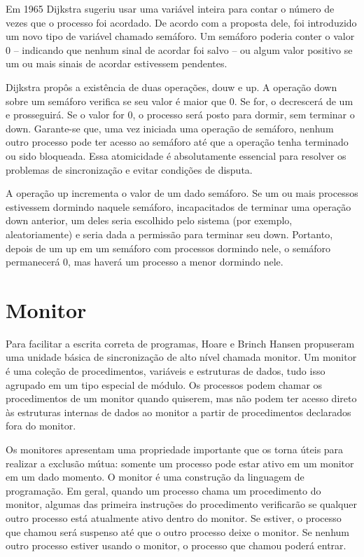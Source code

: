 Em 1965 Dijkstra sugeriu usar uma variável inteira para contar o número de vezes que o 
processo foi acordado. De acordo com a proposta dele, foi introduzido um novo tipo de 
variável chamado semáforo. Um semáforo poderia conter o valor 0 – indicando que nenhum 
sinal de acordar foi salvo – ou algum valor positivo se um ou mais sinais de acordar 
estivessem pendentes.

Dijkstra propôs a existência de duas operações,  douw e up. A operação down sobre um 
semáforo verifica se seu valor é maior que 0. Se for, o decrescerá de um e prosseguirá. 
Se o valor for 0, o processo será posto para dormir, sem terminar o down. Garante-se que, 
uma vez iniciada uma operação de semáforo, nenhum outro processo pode ter acesso ao 
semáforo até que a operação tenha terminado ou sido bloqueada. Essa atomicidade é 
absolutamente essencial para resolver os problemas de sincronização e evitar condições 
de disputa.

A operação up incrementa o valor de um dado semáforo. Se um ou mais processos estivessem 
dormindo naquele semáforo, incapacitados de terminar uma operação down anterior, um deles 
seria escolhido pelo sistema (por exemplo, aleatoriamente) e seria dada a permissão para 
terminar seu down. Portanto, depois de um up em um semáforo com processos dormindo nele, 
o semáforo permanecerá 0, mas haverá um processo a menor dormindo nele.

\section{Monitor}

Para facilitar a escrita correta de programas, Hoare e Brinch Hansen propuseram uma unidade 
básica de sincronização de alto nível chamada monitor.  Um monitor é uma coleção de procedimentos, 
variáveis e estruturas de dados, tudo isso agrupado em um tipo especial de módulo. Os processos 
podem chamar os procedimentos de um monitor quando quiserem, mas não podem ter acesso direto às 
estruturas internas de dados ao monitor a partir de procedimentos declarados fora do monitor.

Os monitores apresentam uma propriedade importante que os torna úteis para realizar a exclusão mútua: 
somente um processo pode estar ativo em um monitor em um dado momento. O monitor é uma construção da 
linguagem de programação. Em geral, quando um processo chama um procedimento do monitor, algumas das 
primeira instruções do procedimento verificarão  se qualquer outro processo está atualmente ativo 
dentro do monitor. Se estiver, o processo que chamou será suspenso até que o outro processo deixe o 
monitor. Se nenhum outro processo estiver usando o monitor, o processo que chamou poderá entrar.

